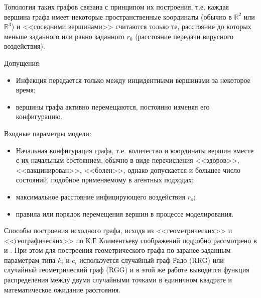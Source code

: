 Топология таких графов связана с принципом их построения, т.е. каждая вершина графа имеет некоторые пространственные координаты (обычно в $\mathbb{R}^2$ или $\mathbb{R}^3$) и <<соседними вершинами>> считаются только те, расстояние до которых  меньше заданного или равно заданного $r_0$ (расстояние передачи вирусного воздействия). 

Допущения:
\begin{itemize}
	\item Инфекция передается только между инцидентными вершинами за некоторое время;
	\item вершины графа активно перемещаются, постоянно изменяя его конфигурацию.
\end{itemize}
Входные параметры модели:
\begin{itemize}
	\item Начальная конфигурация графа, т.е. количество и координаты вершин вместе с их начальным состоянием, обычно в виде перечисления 	<<здоров>>, <<вакцинирован>>, <<болен>>, однако допускается и большее число состояний, подобное применяемому в агентных подходах;
	\item максимальное расстояние инфицирующего воздействия $r_o$;
	\item правила или порядок перемещения вершин в процессе моделирования.
\end{itemize}

Способы построения исходного графа, исходя из <<геометрических>>  и <<географических>> по К.Е Климентьеву соображений подробно рассмотрено в %
 \cite{Klimentiev:2012} и %
\cite{Klimentiev:2015}. При этом для построения геометрического графа по заранее заданным параметрам типа $k_i$ и $c_i$ используется случайный граф Радо (RRG) или случайный геометрический граф (RGG) и в этой же работе %
\cite{Klimentiev:2015} выводится функция распределения  между двумя случайными точками в единичном квадрате и математическое ожидание расстояния.

